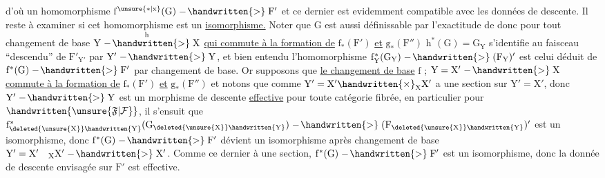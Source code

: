 d'où un homomorphisme $\mathrm{f^{\unsure{*|x}}(G)\mathrel{\relbar\joinrel\handwritten{>}} F'}$ et ce dernier est evidemment
compatible avec les données de descente. Il reste à examiner si cet
homomorphisme est un \uline{isomorphisme.}
Noter que $\mathrm{G}$ est aussi définissable par l'exactitude de
donc pour tout changement de base $\mathrm{Y\overset{h}{\mathrel{\relbar\joinrel\handwritten{>}}}X}$ \uline{qui commute à la formation
de} $\mathrm{f_*(F')}$ \uline{et} $\mathrm{g_*(F'')}$\handwritten{,} $\mathrm{h^*(G)=G_Y}$ s'identifie au faisceau ``descendu''
de $\mathrm{F'_{Y'}}$ par $\mathrm{Y' \mathrel{\relbar\joinrel\handwritten{>}}Y}$, et bien entendu l'homomorphisme
$\mathrm{f_Y^*(G_Y)\mathrel{\relbar\joinrel\handwritten{>}}(F_Y)'}$ est celui déduit de $\mathrm{f^*(G)\mathrel{\relbar\joinrel\handwritten{>}}F'}$ par changement
de base. Or supposons que \uline{le changement de base} $\mathrm{f}$ ; $\mathrm{Y=X'\mathrel{\relbar\joinrel\handwritten{>}}X}$
\uline{commute à la formation de} $\mathrm{f_*(F')}$ \uline{et} $\mathrm{g_*(F'')}$\handwritten{,} et notons que comme
$\mathrm{Y'=X' \handwritten{\times}_X X'}$ a une section sur $\mathrm{Y'=X'}$, donc $\mathrm{Y'\mathrel{\relbar\joinrel\handwritten{>}}Y}$ est un
morphisme de descente \uline{effective} pour toute catégorie fibrée, en particulier
pour $\mathrm{\handwritten{\unsure{\mathfrak F|\mathcal F}}}$, il s'ensuit que $\mathrm{f_{\deleted{\unsure{X}}\handwritten{Y}}^*(G_{\deleted{\unsure{X}}\handwritten{Y}})\mathrel{\relbar\joinrel\handwritten{>}}(F_{\deleted{\unsure{X}}\handwritten{Y}})'}$ est un isomorphisme,
donc $\mathrm{f^*(G)\mathrel{\relbar\joinrel\handwritten{>}}F'}$ dévient un isomorphisme après changement de
base $\mathrm{Y'=X'\quad {}_X X'\mathrel{\relbar\joinrel\handwritten{>}}X'}$. Comme ce dernier à une section,
$\mathrm{f^*(G)\mathrel{\relbar\joinrel\handwritten{>}}F'}$ est un isomorphisme, donc la donnée de descente envisagée
sur $\mathrm{F'}$ est effective.

